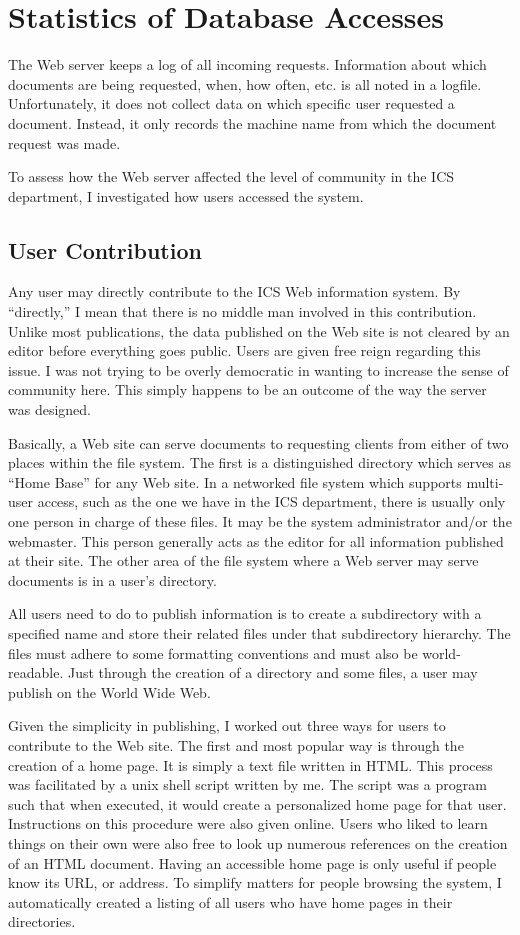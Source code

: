 \section{Statistics of Database Accesses}
The Web server keeps a log of all incoming requests.  Information about which
documents are being requested, when, how often, etc. is all noted in a logfile.
Unfortunately, it does not collect data on which specific user requested a
document.  Instead, it only records the machine name from which the document
request was made.

To assess how the Web server affected the level of community in the ICS
department, I investigated how users accessed the system.

\subsection{User Contribution}
Any user may directly contribute to the ICS Web information system.  By
``directly,'' I mean that there is no middle man involved in this contribution.
Unlike most publications, the data published on the Web site is not cleared by
an editor before everything goes public.  Users are given free reign regarding
this issue.  I was not trying to be overly democratic in wanting to increase
the sense of community here.  This simply happens to be an outcome of the way
the server was designed.

Basically, a Web site can serve documents to requesting clients from either of
two places within the file system.  The first is a distinguished directory
which serves as ``Home Base'' for any Web site.  In a networked file system
which supports multi-user access, such as the one we have in the ICS
department, there is usually only one person in charge of these files.  It may
be the system administrator and/or the webmaster.  This person generally acts
as the editor for all information published at their site.  The other area of
the file system where a Web server may serve documents is in a user's
directory.

All users need to do to publish information is to create a subdirectory with a
specified name and store their related files under that subdirectory hierarchy.
The files must adhere to some formatting conventions and must also be
world-readable.  Just through the creation of a directory and some files, a
user may publish on the World Wide Web.

Given the simplicity in publishing, I worked out three ways for users to
contribute to the Web site.  The first and most popular way is through the
creation of a home page.  It is simply a text file written in HTML.  This
process was facilitated by a unix shell script written by me.  The script was a
program such that when executed, it would create a personalized home page for
that user.  Instructions on this procedure were also given online.  Users who
liked to learn things on their own were also free to look up numerous
references on the creation of an HTML document.  Having an accessible home page
is only useful if people know its URL, or address.  To simplify matters for
people browsing the system, I automatically created a listing of all users who
have home pages in their directories.

